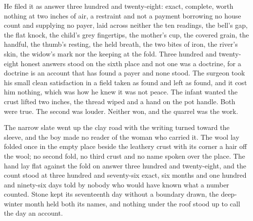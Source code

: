 He filed it as answer three hundred and twenty-eight: exact, complete, worth nothing at two inches of air, a restraint and not a payment borrowing no house count and supplying no payer, laid across neither the ten readings, the bell's gap, the flat knock, the child's grey fingertips, the mother's cup, the covered grain, the handful, the thumb's resting, the held breath, the two bites of iron, the river's skin, the widow's mark nor the keeping at the fold. Three hundred and twenty-eight honest answers stood on the sixth place and not one was a doctrine, for a doctrine is an account that has found a payer and none stood. The surgeon took his small clean satisfaction in a field taken as found and left as found, and it cost him nothing, which was how he knew it was not peace. The infant wanted the crust lifted two inches, the thread wiped and a hand on the pot handle. Both were true. The second was louder. Neither won, and the quarrel was the work.

The narrow slate went up the clay road with the writing turned toward the sleeve, and the boy made no reader of the woman who carried it. The wool lay folded once in the empty place beside the leathery crust with its corner a hair off the wool; no second fold, no third crust and no name spoken over the place. The hand lay flat against the fold on answer three hundred and twenty-eight, and the count stood at three hundred and seventy-six exact, six months and one hundred and ninety-six days told by nobody who would have known what a number counted. Stone kept its seventeenth day without a boundary drawn, the deep-winter month held both its names, and nothing under the roof stood up to call the day an account.
